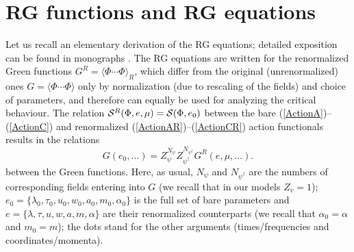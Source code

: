 \documentclass[12pt]{article}
\def\S{{\cal S}}
\begin{document}
\section{RG functions and RG equations} \label{sec:RGE}

Let us recall an elementary derivation of the RG equations; detailed
exposition can be found in monographs \cite{Zinn,Book3}.
The RG equations are written for the renormalized Green functions
$G^{R} =\langle \Phi\cdots\Phi\rangle_{R}$, which differ from the original
(unrenormalized) ones $G =\langle \Phi\cdots\Phi\rangle$ only by
normalization (due to rescaling of the fields) and choice of parameters,
and therefore can equally be used for analyzing the critical behaviour.
The relation $\S^{R} (\Phi,e,\mu) = \S(\Phi,e_{0})$ between the bare
(\ref{ActionA})--(\ref{ActionC}) and renormalized
(\ref{ActionAR})--(\ref{ActionCR}) action functionals results
in the relations
\begin{equation}
G(e_{0},\dots) = Z_{\psi}^{N_{\psi}} Z_{\psi^{\dagger}}^{N_{\psi^{\dagger}}}
G^{R}(e,\mu,\dots).
\label{multi}
\end{equation}
between the Green functions. Here, as usual, $N_{\psi}$ and
$N_{\psi^{\dagger}}$ are the numbers of corresponding fields
entering into $G$ (we recall that in our models $Z_{v}=1$);
$e_{0}=\{\lambda_{0}, \tau_{0}, u_{0}, w_{0}, a_{0}, m_{0}, \alpha_{0} \}$
is the full set of bare parameters and
$e=\{ \lambda, \tau, u, w, a, m, \alpha  \}$ are their renormalized
counterparts (we recall that $\alpha_{0}=\alpha$ and $m_{0}=m$);
the dots stand for the other arguments
(times/frequencies and coordinates/momenta).
\end{document}
